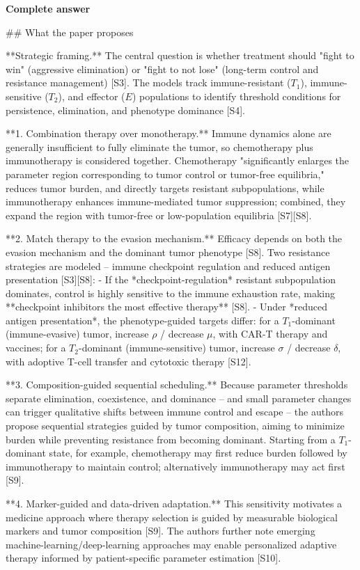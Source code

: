 \documentclass[10pt]{article}
\begin{document}
\textbf{Complete answer}
\begin{AnswerText}
## What the paper proposes

**Strategic framing.** The central question is whether treatment should "fight to win" (aggressive elimination) or "fight to not lose" (long-term control and resistance management) [S3]. The models track immune-resistant ($T_1$), immune-sensitive ($T_2$), and effector ($E$) populations to identify threshold conditions for persistence, elimination, and phenotype dominance [S4].

**1. Combination therapy over monotherapy.** Immune dynamics alone are generally insufficient to fully eliminate the tumor, so chemotherapy plus immunotherapy is considered together. Chemotherapy "significantly enlarges the parameter region corresponding to tumor control or tumor-free equilibria," reduces tumor burden, and directly targets resistant subpopulations, while immunotherapy enhances immune-mediated tumor suppression; combined, they expand the region with tumor-free or low-population equilibria [S7][S8].

**2. Match therapy to the evasion mechanism.** Efficacy depends on both the evasion mechanism and the dominant tumor phenotype [S8]. Two resistance strategies are modeled -- immune checkpoint regulation and reduced antigen presentation [S3][S8]:
- If the *checkpoint-regulation* resistant subpopulation dominates, control is highly sensitive to the immune exhaustion rate, making **checkpoint inhibitors the most effective therapy** [S8].
- Under *reduced antigen presentation*, the phenotype-guided targets differ: for a $T_1$-dominant (immune-evasive) tumor, increase $\rho$ / decrease $\mu$, with CAR-T therapy and vaccines; for a $T_2$-dominant (immune-sensitive) tumor, increase $\sigma$ / decrease $\delta$, with adoptive T-cell transfer and cytotoxic therapy [S12].

**3. Composition-guided sequential scheduling.** Because parameter thresholds separate elimination, coexistence, and dominance -- and small parameter changes can trigger qualitative shifts between immune control and escape -- the authors propose sequential strategies guided by tumor composition, aiming to minimize burden while preventing resistance from becoming dominant. Starting from a $T_1$-dominant state, for example, chemotherapy may first reduce burden followed by immunotherapy to maintain control; alternatively immunotherapy may act first [S9].

**4. Marker-guided and data-driven adaptation.** This sensitivity motivates a medicine approach where therapy selection is guided by measurable biological markers and tumor composition [S9]. The authors further note emerging machine-learning/deep-learning approaches may enable personalized adaptive therapy informed by patient-specific parameter estimation [S10].


\end{AnswerText}
\end{document}
